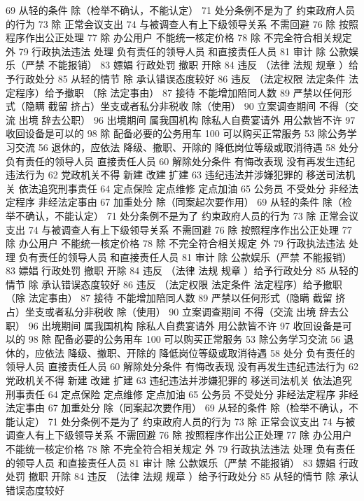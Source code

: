 \documentclass[cyan]{elegantnote}
\begin{document}
69 从轻的条件
除（检举不确认，不能认定）
71 处分条例不是为了
约束政府人员的行为
73 除 正常会议支出
74 与被调查人有上下级领导关系 不需回避
76 除 按照程序作出公正处理
77 除 办公用户
不能统一核定价格
78 除 不完全符合相关规定 外
79 行政执法违法 处理
负有责任的领导人员
和直接责任人员
81 审计
除 公款娱乐（严禁 不能报销）
83 嫖娼 行政处罚
撤职 开除
84 违反 （法律 法规 规章 ）给予行政处分
85 从轻的情节
除 承认错误态度较好
86 违反 （法定权限 法定条件 法定程序）给予撤职
（除 法定事由）
87 接待 不能增加陪同人数
89 严禁以任何形式（隐瞒 截留 挤占）坐支或者私分非税收
除（使用）
90 立案调查期间 不得（交流 出境 辞去公职）
96 出境期间 属我国机构 除私人自费宴请外 用公款皆不许
97 收回设备是可以的
98 除 配备必要的公务用车
100 可以购买正常服务
53 除公务学习交流
56 退休的，应依法
降级、撤职、开除的 降低岗位等级或取消待遇
58 处分
负有责任的领导人员
直接责任人员
60 解除处分条件
有悔改表现
没有再发生违纪违法行为
62 党政机关不得
新建 改建 扩建
63 违纪违法并涉嫌犯罪的
移送司法机关
依法追究刑事责任
64 定点保险 定点维修 定点加油
65 公务员 不受处分
非经法定程序
非经法定事由
67 加重处分
除（同案起次要作用）
69 从轻的条件
除（检举不确认，不能认定）
71 处分条例不是为了
约束政府人员的行为
73 除 正常会议支出
74 与被调查人有上下级领导关系 不需回避
76 除 按照程序作出公正处理
77 除 办公用户
不能统一核定价格
78 除 不完全符合相关规定 外
79 行政执法违法 处理
负有责任的领导人员
和直接责任人员
81 审计
除 公款娱乐（严禁 不能报销）
83 嫖娼 行政处罚
撤职 开除
84 违反 （法律 法规 规章 ）给予行政处分
85 从轻的情节
除 承认错误态度较好
86 违反 （法定权限 法定条件 法定程序）给予撤职
（除 法定事由）
87 接待 不能增加陪同人数
89 严禁以任何形式（隐瞒 截留 挤占）坐支或者私分非税收
除（使用）
90 立案调查期间 不得（交流 出境 辞去公职）
96 出境期间 属我国机构 除私人自费宴请外 用公款皆不许
97 收回设备是可以的
98 除 配备必要的公务用车
100 可以购买正常服务
53 除公务学习交流
56 退休的，应依法
降级、撤职、开除的 降低岗位等级或取消待遇
58 处分
负有责任的领导人员
直接责任人员
60 解除处分条件
有悔改表现
没有再发生违纪违法行为
62 党政机关不得
新建 改建 扩建
63 违纪违法并涉嫌犯罪的
移送司法机关
依法追究刑事责任
64 定点保险 定点维修 定点加油
65 公务员 不受处分
非经法定程序
非经法定事由
67 加重处分
除（同案起次要作用）
69 从轻的条件
除（检举不确认，不能认定）
71 处分条例不是为了
约束政府人员的行为
73 除 正常会议支出
74 与被调查人有上下级领导关系 不需回避
76 除 按照程序作出公正处理
77 除 办公用户
不能统一核定价格
78 除 不完全符合相关规定 外
79 行政执法违法 处理
负有责任的领导人员
和直接责任人员
81 审计
除 公款娱乐（严禁 不能报销）
83 嫖娼 行政处罚
撤职 开除
84 违反 （法律 法规 规章 ）给予行政处分
85 从轻的情节
除 承认错误态度较好
\end{document}

